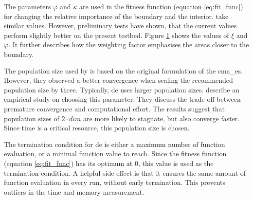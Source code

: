 \documentclass[./\jobname.tex]{subfiles}
\begin{document}
The parameters $\varphi$ and $\kappa$ are used in the fitness function (equation \eqref{eq:fit_func}) for changing the relative importance of the boundary and the interior. \cite{chaquet_using_2019} take similar values. However, preliminary tests have shown, that the current values perform slightly better on the present testbed. Figure \ref{fig:collocation_weight} shows the values of $\xi$ and $\varphi$. It further describes how the weighting factor emphasises the areas closer to the boundary. 

\begin{figure}[h]
	\centering
	\noindent{}
	\label{fig:collocation_weight}
\end{figure}

The population size used by \cite{chaquet_using_2019} is based on the original formulation of the \gls{cma_es}. However, they observed a better convergence when scaling the recommended population size by three. Typically, \gls{de} uses larger population sizes. \cite{mallipeddi_empirical_2008} describe an empirical study on choosing this parameter. They discuss the trade-off between premature convergence and computational effort. The results suggest that population sizes of $2\cdot dim$ are more likely to stagnate, but also converge faster. Since time is a critical resource, this population size is chosen. 

The termination condition for \gls{de} is either a maximum number of function evaluation, or a minimal function value to reach. Since the fitness function (equation \eqref{eq:fit_func}) has its optimum at 0, this value is used as the termination condition. A helpful side-effect is that it ensures the same amount of function evaluation in every run, without early termination. This prevents outliers in the time and memory measurement. 
\end{document}
